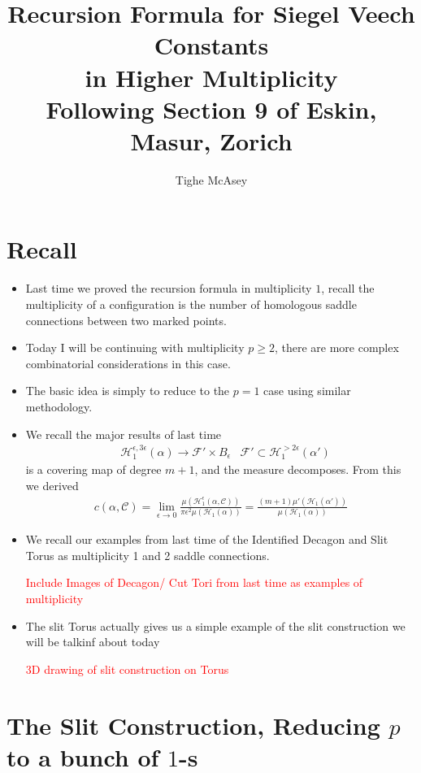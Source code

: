 \documentclass[20pt]{article}
\title{Recursion Formula for Siegel Veech Constants \\ in Higher Multiplicity \\ \large Following Section 9 of Eskin, Masur, Zorich}
\author{Tighe McAsey}
\theoremstyle{definition}
\begin{document}
    \maketitle

    \section{Recall}

    \begin{itemize}
        \item Last time we proved the recursion formula in multiplicity \(1\), recall the multiplicity of a configuration is the number of homologous saddle connections between two marked points.
        \item Today I will be continuing with multiplicity \(p \geq 2\), there are more complex combinatorial considerations in this case.
        \item The basic idea is simply to reduce to the \(p = 1\) case using similar methodology.
        \item We recall the major results of last time
        \begin{align*}
            &\mathcal{H}^{\epsilon,3 \epsilon}_1(\alpha) \to \mathcal{F}' \times B_\epsilon & \mathcal{F}' \subset \mathcal{H}_1^{>2 \epsilon}(\alpha')
        \end{align*}
        is a covering map of degree \(m+1\), and the measure decomposes. From this we derived
        \begin{align*}
            c(\alpha,\mathcal{C}) = \lim_{\epsilon \to 0} \frac{\mu(\mathcal{H}_1^\epsilon(\alpha,\mathcal{C}))}{\pi \epsilon^2 \mu(\mathcal{H}_1(\alpha))} = \frac{(m+1)\mu'(\mathcal{H}_1(\alpha'))}{\mu(\mathcal{H}_1(\alpha))}
        \end{align*}
        \item We recall our examples from last time of the Identified Decagon and Slit Torus as multiplicity 1 and 2 saddle connections.
        
        \textcolor{red}{Include Images of Decagon/ Cut Tori from last time as examples of multiplicity}
        \item The slit Torus actually gives us a simple example of the slit construction we will be talkinf about today
        
        \textcolor{red}{3D drawing of slit construction on Torus}
    \end{itemize}

    \section{The Slit Construction, Reducing \(p\) to a bunch of \(1\)-s}
\end{document}
